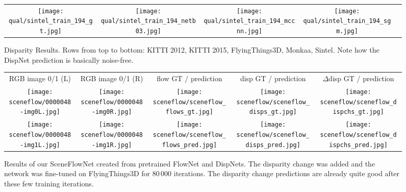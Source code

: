 \documentclass[10pt,twocolumn,letterpaper]{article}
\begin{document}
\begin{figure*}[t]
\begin{center}
{\begin{tabular}{ccccc}
      \texttt{[image: qual/sintel\_train\_194\_gt.jpg]} &
      \texttt{[image: qual/sintel\_train\_194\_netb03.jpg]} &
      \texttt{[image: qual/sintel\_train\_194\_mccnn.jpg]} &
      \texttt{[image: qual/sintel\_train\_194\_sgm.jpg]} \\
    \end{tabular}
  }
  \end{center}
  \caption{Disparity Results. Rows from top to bottom: KITTI 2012, KITTI 2015, FlyingThings3D, Monkaa, Sintel. Note how the DispNet prediction is basically noise-free.}
  \label{fig:gallery_disp}
\end{figure*}

\begin{figure*}[t]
  \begin{center}{
    \setlength{\tabcolsep}{1pt}%
    \begin{tabular}{ccccc}
      RGB image 0/1 (L) & 
      RGB image 0/1 (R) & 
      flow GT / prediction & 
      disp GT / prediction & 
      $\Delta$disp GT / prediction \\
      
      \texttt{[image: sceneflow/0000048-img0L.jpg]} &
      \texttt{[image: sceneflow/0000048-img0R.jpg]} &
      \texttt{[image: sceneflow/sceneflow\_flows\_gt.jpg]} &
      \texttt{[image: sceneflow/sceneflow\_disps\_gt.jpg]} &
      \texttt{[image: sceneflow/sceneflow\_dispchs\_gt.jpg]} \\
      
      \texttt{[image: sceneflow/0000048-img1L.jpg]} &
      \texttt{[image: sceneflow/0000048-img1R.jpg]} &
      \texttt{[image: sceneflow/sceneflow\_flows\_pred.jpg]} &
      \texttt{[image: sceneflow/sceneflow\_disps\_pred.jpg]} &
      \texttt{[image: sceneflow/sceneflow\_dispchs\_pred.jpg]} \\
    \end{tabular}
  }
  \end{center}
  \caption{Results of our SceneFlowNet created from pretrained FlowNet and DispNets. The disparity change was added and the network was fine-tuned on FlyingThings3D for $80\,000$ iterations. The disparity change predictions are already quite good after these few training iterations.}
  \label{fig:gallery_sceneflow}
\end{figure*}
\end{document}
